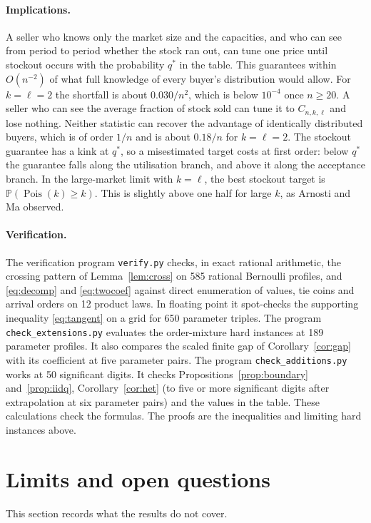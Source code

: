 \documentclass[11pt,a4paper]{article}
\theoremstyle{remark}
\newcommand{\Prob}{\mathbb P}
\newcommand{\Pois}{\operatorname{Pois}}
\begin{document}
\paragraph{Implications.}
A seller who knows only the market size and the capacities, and who can see from period to period whether the stock ran out, can tune one price until stockout occurs with the probability $q^*$ in the table. This guarantees within $O(n^{-2})$ of what full knowledge of every buyer's distribution would allow. For $k=\ell=2$ the shortfall is about $0.030/n^2$, which is below $10^{-4}$ once $n\ge20$. A seller who can see the average fraction of stock sold can tune it to $C_{n,k,\ell}$ and lose nothing. Neither statistic can recover the advantage of identically distributed buyers, which is of order $1/n$ and is about $0.18/n$ for $k=\ell=2$. The stockout guarantee has a kink at $q^*$, so a misestimated target costs at first order: below $q^*$ the guarantee falls along the utilisation branch, and above it along the acceptance branch. In the large-market limit with $k=\ell$, the best stockout target is $\Prob(\Pois(k)\ge k)$. This is slightly above one half for large $k$, as Arnosti and Ma observed.

\paragraph{Verification.}
The verification program \texttt{verify.py} checks, in exact rational arithmetic, the crossing pattern of Lemma~\ref{lem:cross} on 585 rational Bernoulli profiles, and \eqref{eq:decomp} and \eqref{eq:twocoef} against direct enumeration of values, tie coins and arrival orders on 12 product laws. In floating point it spot-checks the supporting inequality \eqref{eq:tangent} on a grid for 650 parameter triples. The program \texttt{check\_extensions.py} evaluates the order-mixture hard instances at 189 parameter profiles. It also compares the scaled finite gap of Corollary~\ref{cor:gap} with its coefficient at five parameter pairs. The program \texttt{check\_additions.py} works at 50 significant digits. It checks Propositions~\ref{prop:boundary} and~\ref{prop:iidq}, Corollary~\ref{cor:het} (to five or more significant digits after extrapolation at six parameter pairs) and the values in the table. These calculations check the formulas. The proofs are the inequalities and limiting hard instances above.

\section{Limits and open questions}\label{sec:discussion}
This section records what the results do not cover.
\end{document}
